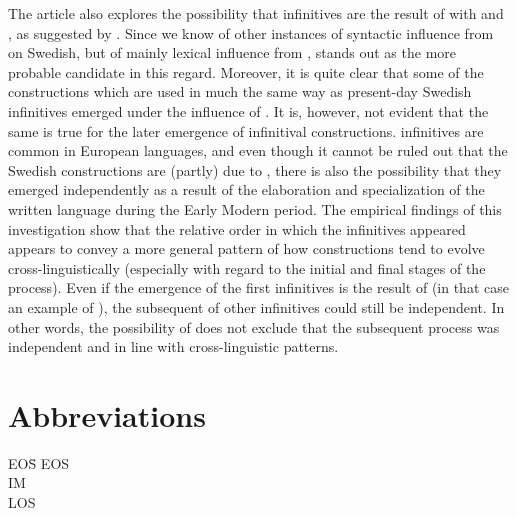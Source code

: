 \documentclass[output=paper]{langscibook}
\begin{document}
The article also explores the possibility that  infinitives are the result of  with  and , as suggested by \citet{Holm1967}. Since we know of other instances of syntactic influence from  on Swedish, but of mainly lexical influence from ,  stands out as the more probable candidate in this regard. Moreover, it is quite clear that some of the   constructions which are used in much the same way as present-day Swedish  infinitives emerged under the influence of . It is, however, not evident that the same is true for the later emergence of infinitival constructions.  infinitives are common in European languages, and even though it cannot be ruled out that the Swedish constructions are (partly) due to , there is also the possibility that they emerged independently as a result of the elaboration and specialization of the written language during the Early Modern period. The empirical findings of this investigation show that the relative order in which the  infinitives appeared appears to convey a more general pattern of how  constructions tend to evolve cross-linguistically (especially with regard to the initial and final stages of the process). Even if the emergence of the first  infinitives is the result of  (in that case an example of ), the subsequent  of other  infinitives could still be independent. In other words, the possibility of  does not exclude that the subsequent  process was independent and in line with cross-linguistic patterns. 


\section*{Abbreviations}
\begin{tabbing}
EOS\hspace{1ex}\= \kill
EOS \> \\
IM  \> \\
LOS \> \\
\end{tabbing}
\end{document}
